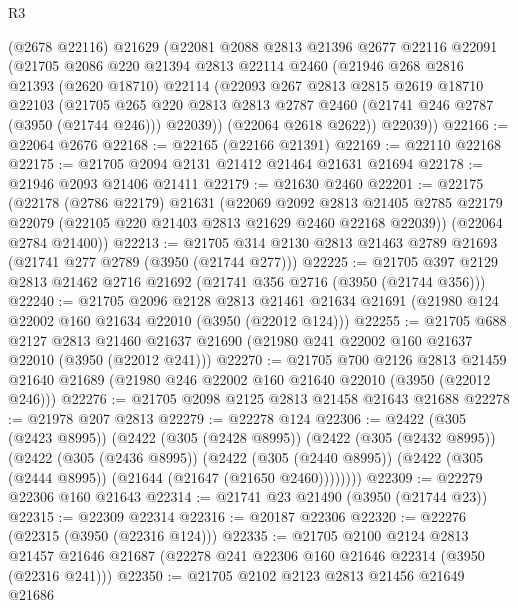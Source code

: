 \begin{lexlean}{R3}
\begin{coremodule}
    (@2678 @22116)
    @21629
    (@22081
      @2088
      @2813
      @21396
      @2677
      @22116
      @22091
      (@21705
        @2086
        @220
        @21394
        @2813
        @22114
        @2460
        (@21946
          @268
          @2816
          @21393
          (@2620 @18710)
          @22114
          (@22093
            @267
            @2813
            @2815
            @2619
            @18710
            @22103
            (@21705
              @265
              @220
              @2813
              @2813
              @2787
              @2460
              (@21741 @246 @2787 (@3950 (@21744 @246)))
              @22039))
          (@22064 @2618 @2622))
        @22039))
@22166 := @22064 @2676
@22168 := @22165 (@22166 @21391)
@22169 := @22110 @22168
@22175 := @21705 @2094 @2131 @21412 @21464 @21631 @21694
@22178 := @21946 @2093 @21406 @21411
@22179 := @21630 @2460
@22201 := @22175
    (@22178
      (@2786 @22179)
      @21631
      (@22069
        @2092
        @2813
        @21405
        @2785
        @22179
        @22079
        (@22105 @220 @21403 @2813 @21629 @2460 @22168 @22039))
      (@22064 @2784 @21400))
@22213 := @21705 @314 @2130 @2813 @21463 @2789 @21693 (@21741 @277 @2789 (@3950 (@21744 @277)))
@22225 := @21705 @397 @2129 @2813 @21462 @2716 @21692 (@21741 @356 @2716 (@3950 (@21744 @356)))
@22240 := @21705
    @2096
    @2128
    @2813
    @21461
    @21634
    @21691
    (@21980 @124 @22002 @160 @21634 @22010 (@3950 (@22012 @124)))
@22255 := @21705
    @688
    @2127
    @2813
    @21460
    @21637
    @21690
    (@21980 @241 @22002 @160 @21637 @22010 (@3950 (@22012 @241)))
@22270 := @21705
    @700
    @2126
    @2813
    @21459
    @21640
    @21689
    (@21980 @246 @22002 @160 @21640 @22010 (@3950 (@22012 @246)))
@22276 := @21705 @2098 @2125 @2813 @21458 @21643 @21688
@22278 := @21978 @207 @2813
@22279 := @22278 @124
@22306 := @2422
    (@305 (@2423 @8995))
    (@2422
      (@305 (@2428 @8995))
      (@2422
        (@305 (@2432 @8995))
        (@2422
          (@305 (@2436 @8995))
          (@2422
            (@305 (@2440 @8995))
            (@2422 (@305 (@2444 @8995)) (@21644 (@21647 (@21650 @2460))))))))
@22309 := @22279 @22306 @160 @21643
@22314 := @21741 @23 @21490 (@3950 (@21744 @23))
@22315 := @22309 @22314
@22316 := @20187 @22306
@22320 := @22276 (@22315 (@3950 (@22316 @124)))
@22335 := @21705
    @2100
    @2124
    @2813
    @21457
    @21646
    @21687
    (@22278 @241 @22306 @160 @21646 @22314 (@3950 (@22316 @241)))
@22350 := @21705
    @2102
    @2123
    @2813
    @21456
    @21649
    @21686

\end{coremodule}
\end{lexlean}
